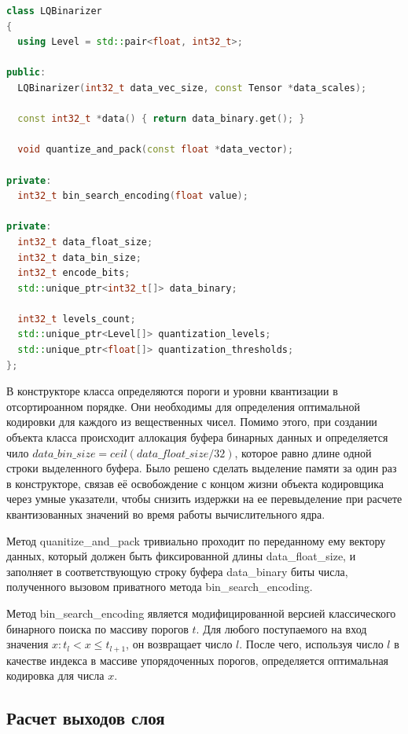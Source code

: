 \begin{lstlisting}[language=C++, caption={Класс кодировщика}]
class LQBinarizer
{
  using Level = std::pair<float, int32_t>;

public:
  LQBinarizer(int32_t data_vec_size, const Tensor *data_scales);

  const int32_t *data() { return data_binary.get(); }

  void quantize_and_pack(const float *data_vector);

private:
  int32_t bin_search_encoding(float value);

private:
  int32_t data_float_size;
  int32_t data_bin_size;
  int32_t encode_bits;
  std::unique_ptr<int32_t[]> data_binary;

  int32_t levels_count;
  std::unique_ptr<Level[]> quantization_levels;
  std::unique_ptr<float[]> quantization_thresholds;
};
\end{lstlisting}

В конструкторе класса определяются пороги и уровни квантизации в отсортироанном порядке. Они необходимы для определения оптимальной кодировки для каждого из вещественных чисел. Помимо этого, при создании объекта класса происходит аллокация буфера бинарных данных и определяется чило $data\_bin\_size = ceil(data\_float\_size / 32)$, которое равно длине одной строки выделенного буфера. Было решено сделать выделение памяти за один раз в конструкторе, связав её освобождение с концом жизни объекта кодировщика через умные указатели, чтобы снизить издержки на ее перевыделение при расчете квантизованных значений во время работы вычислительного ядра. 

Метод quanitize\_and\_pack тривиально проходит по переданному ему вектору данных, который должен быть фиксированной длины data\_float\_size, и заполняет в соответствующую строку буфера data\_binary биты числа, полученного вызовом приватного метода bin\_search\_encoding. 

Метод bin\_search\_encoding является модифицированной версией классического бинарного поиска по массиву порогов $t$. Для любого поступаемого на вход значения $x: t_l < x \leq t_{l + 1}$, он возвращает число $l$. После чего, используя число $l$ в качестве индекса в массиве упорядоченных порогов, определяется оптимальная кодировка для числа $x$.

\subsection{Расчет выходов слоя}

